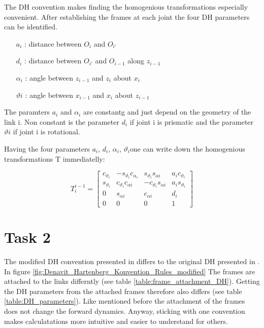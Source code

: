 \documentclass{tpk4170report}
\begin{document}
The DH convention makes finding the homogenious transformations especially convenient. After establishing the frames at each joint the four DH parameters can be identified. 

\begin{itemize}
  \item[\(a_{i}\)]: distance between \(O_{i}\) and \(O_{i'}\) 
  \item[\(d_{i}\)]: distance between \(O_{i'}\) and \(O_{i-1}\) along \(z_{i-1}\)
  \item[\(\alpha_{i}\)]: angle between \(z_{i-1}\) and \(z_{i}\) about \(x_{i}\)
  \item[\(\vartheta{i}\)]:  angle between \(x_{i-1}\) and \(x_{i}\) about \(z_{i-1}\)
\end{itemize}

The paramters \(a_{i}\) and \(\alpha_{i}\) are constantg and just depend on the geometry of the link i. Non constant is the parameter \(d_{i}\) if joint i is prismatic and the parameter \(\vartheta{i}\) if joint i is rotational.

Having the four parameters \(a_{i}\), \(d_{i}\), \(\alpha_{i}\), \(\vartheta_{i}\)one can write down the homogenious transformations T immediatelly: 

\begin{equation}
  T_{i}^{i-1}= 
  \begin{bmatrix}
    c_{\vartheta_{i}} & -s_{\vartheta_{i}}c_{\alpha_{i}} &  s_{\vartheta_{i}}s_{\alpha{i}} & a_{i}c_{\vartheta_{i}} \\
    s_{\vartheta_{i}} & c_{\vartheta_{i}}c_{\alpha{i}} & -c_{\vartheta_{i}}s_{\alpha{i}} & a_{i}s_{\vartheta_{i}} \\
    0 & s_{\alpha{i}} & c_{\alpha{i}} & d_{i} \\
    0 & 0 & 0 & 1
  \end{bmatrix}
  \label{eqn:Transformation_Denavit_Hartenberg}
\end{equation}
\cite{Siciliano2009}

\section{Task 2}
The modified DH convention presented in \cite{Lynch2017} differs to the original DH presented in \cite{Siciliano2009}. In figure \ref{fig:Denavit_Hartenberg_Konvention_Rules_modified} The frames are attached to the links differntly (see table \ref{table:frame_attachment_DH}). Getting the DH parameters from the attached frames therefore also differs (see table \ref{table:DH_parameters}). Like mentioned before the attachment of the frames does not change the forward dynamics. Anyway, sticking with one convention makes calculatations more intuitive and easier to understand for others.
\end{document}
